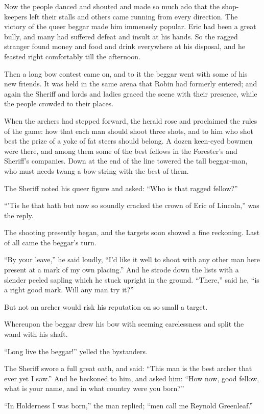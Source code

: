 Now the people danced and shouted and made so much ado that the
shop-keepers left their stalls and others came running from every
direction. The victory of the queer beggar made him immensely popular.
Eric had been a great bully, and many had suffered defeat and insult at
his hands. So the ragged stranger found money and food and drink
everywhere at his disposal, and he feasted right comfortably till the
afternoon.

Then a long bow contest came on, and to it the beggar went with some of
his new friends. It was held in the same arena that Robin had formerly
entered; and again the Sheriff and lords and ladies graced the scene
with their presence, while the people crowded to their places.

When the archers had stepped forward, the herald rose and proclaimed the
rules of the game: how that each man should shoot three shots, and to
him who shot best the prize of a yoke of fat steers should belong. A
dozen keen-eyed bowmen were there, and among them some of the best
fellows in the Forester's and Sheriff's companies. Down at the end of
the line towered the tall beggar-man, who must needs twang a bow-string
with the best of them.

The Sheriff noted his queer figure and asked: ``Who is that ragged
fellow?''

``'Tis he that hath but now so soundly cracked the crown of Eric of
Lincoln,'' was the reply.

The shooting presently began, and the targets soon showed a fine
reckoning. Last of all came the beggar's turn.

``By your leave,'' he said loudly, ``I'd like it well to shoot with any
other man here present at a mark of my own placing.'' And he strode down
the lists with a slender peeled sapling which he stuck upright in the
ground. ``There,'' said he, ``is a right good mark. Will any man try
it?''

But not an archer would risk his reputation on so small a target.

Whereupon the beggar drew his bow with seeming carelessness and split
the wand with his shaft.

``Long live the beggar!'' yelled the bystanders.

The Sheriff swore a full great oath, and said: ``This man is the best
archer that ever yet I saw.'' And he beckoned to him, and asked him:
``How now, good fellow, what is your name, and in what country were you
born?''

``In Holderness I was born,'' the man replied; ``men call me Reynold
Greenleaf.''

